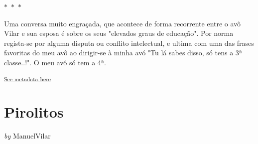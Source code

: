 \documentclass{article}
\begin{document}
 
    

    $\ast$~$\ast$~$\ast$  


    \begin{center}
        \begin{minipage}{0.9\textwidth}
            \setlength{\parskip}{0.2cm}
            \setlength{\parindent}{0cm}
            \fontsize{12pt}{14pt}\selectfont
            


Uma conversa muito engraçada, que acontece de forma recorrente entre o avô Vilar e sua esposa é sobre os seus "elevados graus de educação". Por norma
regista-se por alguma disputa ou conflito intelectual, e ultima com uma
das frases favoritas do meu avô ao dirigir-se à minha avó "Tu lá sabes
disso, só tens a 3ª classe..!". O meu avô só tem a 4ª.

        \end{minipage}
    \end{center}

    
        \textsuperscript{\hyperref[table:\arabic{tablecounter}]{See metadata here}}
    


\newpage
\section{Pirolitos}


    
        \textit{by} ManuelVilar
    
\end{document}
